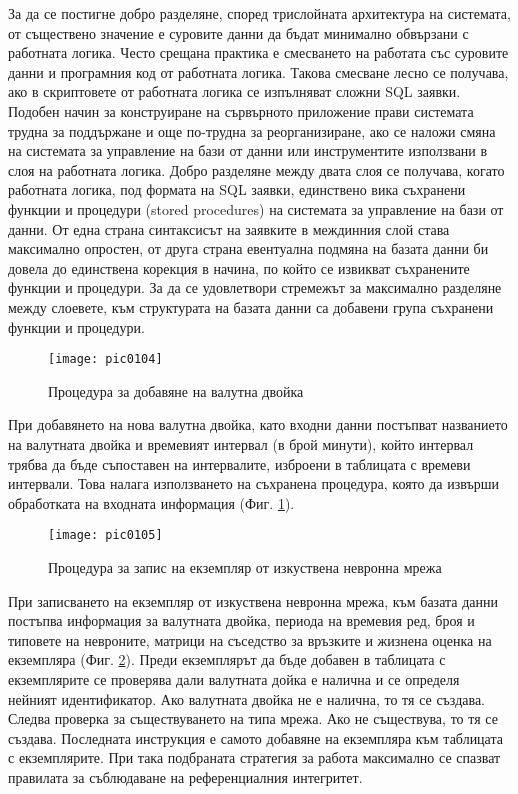 За да се постигне добро разделяне, според трислойната архитектура на системата, от съществено значение е суровите данни да бъдат минимално обвързани с работната логика. Често срещана практика е смесването на работата със суровите данни и програмния код от работната логика. Такова смесване лесно се получава, ако в скриптовете от работната логика се изпълняват сложни SQL заявки. Подобен начин за конструиране на сървърното приложение прави системата трудна за поддържане и още по-трудна за реорганизиране, ако се наложи смяна на системата за управление на бази от данни или инструментите използвани в слоя на работната логика. Добро разделяне между двата слоя се получава, когато работната логика, под формата на SQL заявки, единствено вика съхранени функции и процедури (stored procedures) на системата за управление на бази от данни. От една страна синтаксисът на заявките в междинния слой става максимално опростен, от друга страна евентуална подмяна на базата данни би довела до единствена корекция в начина, по който се извикват съхранените функции и процедури. За да се удовлетвори стремежът за максимално разделяне между слоевете, към структурата на базата данни са добавени група съхранени функции и процедури. 

\begin{figure}[h]
  \centering
  \texttt{[image: pic0104]}
  \caption{Процедура за добавяне на валутна двойка}
\label{fig:pic0104}
\end{figure}
\FloatBarrier

При добавянето на нова валутна двойка, като входни данни постъпват названието на валутната двойка и времевият интервал (в брой минути), който интервал трябва да бъде съпоставен на интервалите, изброени в таблицата с времеви интервали. Това налага използването на съхранена процедура, която да извърши обработката на входната информация (Фиг. \ref{fig:pic0104}). 

\begin{figure}[h]
  \centering
  \texttt{[image: pic0105]}
  \caption{Процедура за запис на екземпляр от изкуствена невронна мрежа}
\label{fig:pic0105}
\end{figure}
\FloatBarrier

При записването на екземпляр от изкуствена невронна мрежа, към базата данни постъпва информация за валутната двойка, периода на времевия ред, броя и типовете на невроните, матрици на съседство за връзките и жизнена оценка на екземпляра (Фиг. \ref{fig:pic0105}). Преди екземплярът да бъде добавен в таблицата с екземплярите се проверява дали валутната дойка е налична и се определя нейният идентификатор. Ако валутната двойка не е налична, то тя се създава. Следва проверка за съществуването на типа мрежа. Ако не съществува, то тя се създава. Последната инструкция е самото добавяне на екземпляра към таблицата с екземплярите. При така подбраната стратегия за работа максимално се спазват правилата за съблюдаване на референциалния интегритет. 

